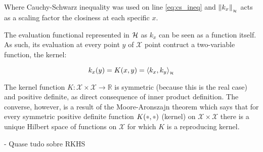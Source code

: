 Where Cauchy-Schwarz inequality was used on line \ref{eq:cs_ineq} and
\(\left\lVert k_x\right\rVert_{_{\mathcal{H}}}\) acts as a scaling factor the closiness at each specific $x$.

The evaluation functional represented in $\mathcal{H}$ as $k_x$ can be seen as a
function itself. As such, its evaluation at every point $y$ of $\mathcal{X}$
point contruct a two-variable function, the kernel:

\begin{equation}
k_x(y) = K(x,y) = \langle k_x,k_y\rangle_{_{\mathcal{H}}}
\end{equation}

The kernel function \(K:\mathcal{X}\times\mathcal{X}\to\mathbb{R}\) is
symmetric (because this is the real case) and positive definite, as direct consequence of
inner product definition. The converse, however, is a result of the
Moore-Aronszajn theorem which says that for every symmetric positive definite
function $K(\parm,\parm)$ (kernel) on \(\mathcal{X}\times\mathcal{X}\) there is a unique
Hilbert space of functions on \(\mathcal{X}\) for which $K$ is a reproducing
kernel.

 

\citet{berlinet2011reproducing} -  Quase tudo sobre RKHS